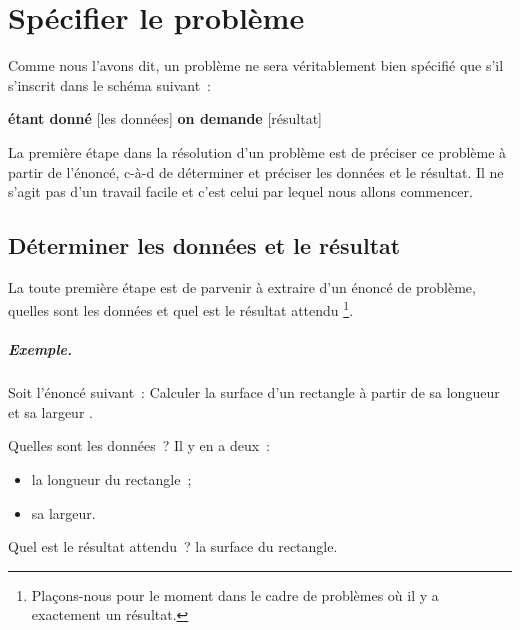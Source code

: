 \chapter{Spécifier le problème}

	Comme nous l’avons dit, 
	un problème ne sera véritablement bien spécifié 
	que s’il s’inscrit dans le schéma suivant~:
		
	\medskip
	\begin{center}
	\begin{Ovalbox}
		{\textbf{étant donné} [les données] 
		\textbf{on demande} [résultat]}
	\end{Ovalbox}
	\end{center}
	\medskip
	
	La première étape dans la résolution d’un problème est de
	préciser ce problème à partir de l’énoncé,
	c-à-d de déterminer et préciser les données et le résultat.
	Il ne s’agit pas d’un travail facile 
	et c’est celui par lequel nous allons commencer.

	\section{Déterminer les données et le résultat}
	
		La toute première étape est de parvenir à extraire
		d’un énoncé de problème, quelles sont les données
		et quel est le résultat attendu%
		\footnote{%
			Plaçons-nous pour le moment dans le cadre
			de problèmes où il y a exactement un résultat.%
		}.
	
		\begin{Emphase}
			\paragraph{Exemple.}
			Soit l’énoncé suivant~:
			\og
				Calculer la surface d’un rectangle 
				à partir de sa longueur et sa largeur
			\fg.
			
			Quelles sont les données~? Il y en a deux~:	
			\begin{itemize}
				\item la longueur du rectangle~;
				\item sa largeur.
			\end{itemize}
		
			Quel est le résultat attendu~? la surface du rectangle.
		\end{Emphase}
		
